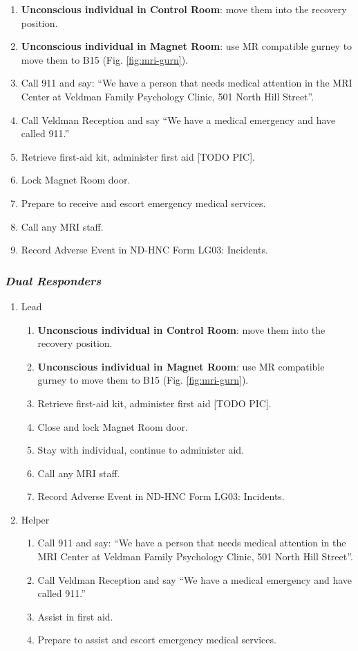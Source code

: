 \documentclass[11pt]{article}
\begin{document}
\begin{enumerate}
	\item \textbf{Unconscious individual in Control Room}: move them into the recovery position.
	\item \textbf{Unconscious individual in Magnet Room}: use MR compatible gurney to move them to B15 (Fig. \ref{fig:mri-gurn}).
	\item Call 911 and say: ``We have a person that needs medical attention in the MRI Center at Veldman Family Psychology Clinic, 501 North Hill Street''.
	\item Call Veldman Reception and say ``We have a medical emergency and have called 911.''
	\item Retrieve first-aid kit, administer first aid [TODO PIC].
	\item Lock Magnet Room door.
	\item Prepare to receive and escort emergency medical services.
	\item Call any MRI staff.
	\item Record Adverse Event in ND-HNC Form LG03: Incidents.
\end{enumerate}

\subsubsection*{\textit{Dual Responders}}

\begin{enumerate}
	\item Lead
	\begin{enumerate}
		\item \textbf{Unconscious individual in Control Room}: move them into the recovery position.
		\item \textbf{Unconscious individual in Magnet Room}: use MR compatible gurney to move them to B15 (Fig. \ref{fig:mri-gurn}).
		\item Retrieve first-aid kit, administer first aid [TODO PIC].
		\item Close and lock Magnet Room door.
		\item Stay with individual, continue to administer aid.
		\item Call any MRI staff.
		\item Record Adverse Event in ND-HNC Form LG03: Incidents.
	\end{enumerate}

	\item Helper
	\begin{enumerate}
		\item Call 911 and say: ``We have a person that needs medical attention in the MRI Center at Veldman Family Psychology Clinic, 501 North Hill Street''.
		\item Call Veldman Reception and say ``We have a medical emergency and have called 911.''
		\item Assist in first aid.
		\item Prepare to assist and escort emergency medical services.
	\end{enumerate}
\end{enumerate}
\end{document}
